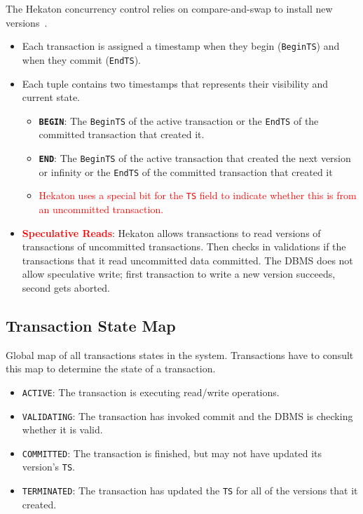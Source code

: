 \documentclass[11pt]{article}
\newcommand{\rr}[1]{\textcolor{red}{#1}}
\begin{document}
The Hekaton concurrency control relies on compare-and-swap to install new 
versions~\cite{p298-larson}.
\begin{itemize}
    \item
    Each transaction is assigned a timestamp when they begin (\texttt{BeginTS}) and when they 
    commit (\texttt{EndTS}).
        
    \item
    Each tuple contains two timestamps that represents their visibility and current state.
    \begin{itemize}
        \item \textbf{\texttt{BEGIN}}:
        The \texttt{BeginTS} of the active transaction or the \texttt{EndTS} of the committed 
        transaction that created it.
            
        \item \textbf{\texttt{END}}:
        The \texttt{BeginTS} of the active transaction that created the next version or 
        infinity or the \texttt{EndTS} of the committed transaction that created it
        
        \item \rr{Hekaton uses a special bit for the \texttt{TS} field to indicate whether this is from an uncommitted transaction.}

    \end{itemize}
    
    \item \rr{\textbf{Speculative Reads}}:
    Hekaton allows transactions to read versions of transactions of uncommitted 
    transactions. Then checks in validations if the transactions that it read uncommitted data 
    committed.
    The DBMS does not allow speculative write; first transaction to write a new version succeeds, 
    second gets aborted.
\end{itemize}

\subsection*{Transaction State Map}
Global map of all transactions states in the system. Transactions have to consult this map to 
determine the 
state of a transaction.
\begin{itemize}
    \item \texttt{ACTIVE}:
    The transaction is executing read/write operations.
    
    \item \texttt{VALIDATING}:
    The transaction has invoked commit and the DBMS is checking whether it is valid.
    
    \item \texttt{COMMITTED}:
    The transaction is finished, but may not have updated its version's \texttt{TS}.
    
    \item \texttt{TERMINATED}:
    The transaction has updated the \texttt{TS} for all of the versions that it created.
\end{itemize}
\end{document}

